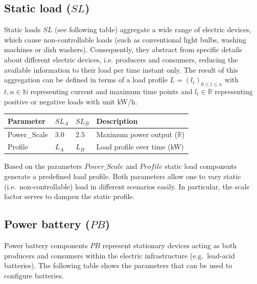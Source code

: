 \subsection{Static load ($SL$)}

Static loads $SL$ (see following table) aggregate a wide range of electric devices, which cause non-controllable loads (such as conventional light bulbs, washing machines or dish washers). Consequently, they abstract from specific details about different electric devices, i.e. producers and consumers, reducing the available information to their load per time instant only. The result of this aggregation can be defined in terms of a load profile $L = (l_t)_{0 \leq t \leq n}$ with $t,n \in \mathbb{N}$ representing current and maximum time points and $l_t \in \mathbb{R}$ representing positive or negative loads with unit kW/h.

\begin{table}[h]
	\renewcommand{\arraystretch}{1.3}
	\centering
	\begin{tabularx}{\columnwidth}{lllX}
		\hline
		\textbf{Parameter}              & \textbf{$SL_{A}$}  & \textbf{$SL_{B}$}   & \textbf{Description} \\ \hline
		Power\_Scale                   	  & $3.0$ & $2.5$ & Maximum power output ($\mathbb{R}$) \\
		Profile                       	  	   & $L_A$ & $L_B$ & Load profile over time  (kW)\\ \hline
	\end{tabularx}
\end{table}

Based on the parameters $Power\_Scale$ and $Profile$ static load components generate a predefined load profile. Both parameters allow one to vary static (i.e.\ non-controllable) load in different scenarios easily. In particular, the scale factor serves to dampen the static profile.

\subsection{Power battery ($PB$)}

Power battery components $PB$ represent stationary devices acting as both producers and consumers within the electric infrastructure (e.g.\ lead-acid batteries). The following table shows the parameters that can be used to configure batteries.

